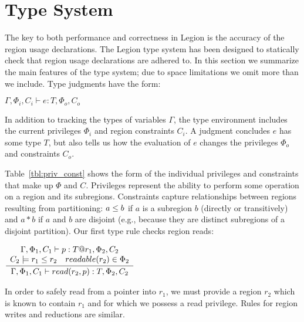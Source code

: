 \section{Type System}
\label{sec:type}

The key to both performance and correctness in Legion is the
accuracy of the region usage declarations.  The Legion type system has been
designed to statically check that region usage declarations are adhered to.
In this section we summarize the main features of the type system; due to space limitations we omit more than
we include.
Type judgments have the form:
\begin{center}
$\Gamma, \Phi_i, C_i \vdash e : T, \Phi_o, C_o$
\end{center}
In addition to tracking the types of variables $\Gamma$, the
type environment includes the current privileges $\Phi_i$ 
and region constraints $C_i$.  A judgment concludes $e$ has some type $T$,
but also tells us how the evaluation of $e$ changes the privileges $\Phi_o$ and constraints $C_o$.

Table~\ref{tbl:priv_const} shows the form of the individual privileges and
constraints that make up $\Phi$ and $C$.  Privileges represent the ability to
perform some operation on a region and its subregions.  Constraints capture relationships between regions
resulting from partitioning: $a \leq b$ if $a$ is a subregion $b$ (directly or transitively) and $a \ast b$ if
$a$ and $b$ are disjoint (e.g., because they are distinct subregions of a disjoint partition).
Our first type rule checks region reads:

\begin{center}
{\small
\begin{math}
\infrule{
\begin{array}{lc}
  \multicolumn{2}{c}{\Gamma, \Phi_1, C_1 \vdash p : T@r_1, \Phi_2, C_2} \\
  C_2 \models r_1 \le r_2 & readable(r_2) \in \Phi_2
\end{array}
}
{
  \Gamma, \Phi_1, C_1 \vdash read(r_2, p) : T, \Phi_2, C_2
}
\end{math} 
}
\end{center}

In order to safely read from a pointer into $r_1$, we must 
provide a region $r_2$ which is known to contain $r_1$ and for which we possess
a read privilege.  Rules for region writes and reductions are similar.

